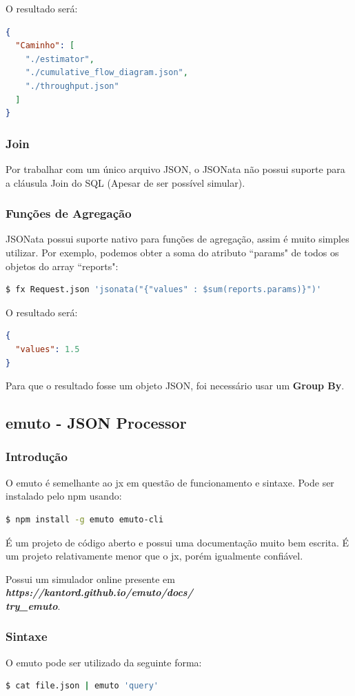 \documentclass[a4paper, 12pt] {article}
\begin{document}
				O resultado será:
\begin{lstlisting}[language=json,firstnumber=1]
{
  "Caminho": [
    "./estimator",
    "./cumulative_flow_diagram.json",
    "./throughput.json"
  ]
}
\end{lstlisting}
			\subsubsection{Join}
				Por trabalhar com um único arquivo JSON, o JSONata não possui suporte para a cláusula Join do SQL (Apesar de ser possível simular).
			\subsubsection{Funções de Agregação}
				JSONata possui suporte nativo para funções de agregação, assim é muito simples utilizar. Por exemplo, podemos obter a soma do atributo “params" de todos os objetos do array “reports":
\begin{lstlisting}[language=bash]
$ fx Request.json 'jsonata("{"values" : $sum(reports.params)}")'
\end{lstlisting}

				O resultado será:
\begin{lstlisting}[language=json,firstnumber=1]
{
  "values": 1.5
}
\end{lstlisting}

				Para que o resultado fosse um objeto JSON, foi necessário usar um \textbf{Group By}.
		\newpage \subsection{emuto - JSON Processor}
			\subsubsection{Introdução}
				O emuto é semelhante ao jx em questão de funcionamento e sintaxe. Pode ser instalado pelo npm usando:
\begin{lstlisting}[language=bash]
$ npm install -g emuto emuto-cli
\end{lstlisting}

				É um projeto de código aberto e possui uma documentação muito bem escrita. É um projeto relativamente menor que o jx, porém igualmente confiável.

				Possui um simulador online presente em \textit{\textbf{https://kantord.github.io/emuto/docs/\\try\_emuto}}.
			\subsubsection{Sintaxe}
				O emuto pode ser utilizado da seguinte forma:
\begin{lstlisting}[language=bash]
$ cat file.json | emuto 'query'
\end{lstlisting}
\end{document}
